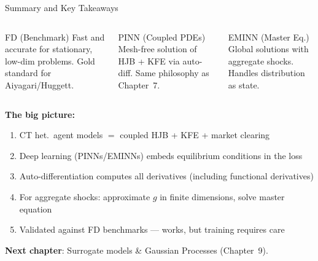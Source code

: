 \documentclass[aspectratio=169,11pt]{beamer}
\newcommand{\emphc}[1]{\textcolor{harvardcrimson}{#1}}
\begin{document}
\begin{frame}{Summary and Key Takeaways}
\begin{columns}[T]
\begin{block}{FD (Benchmark)}
\centering\small
\vspace{0.1em}
Fast and accurate for \emphc{stationary, low-dim} problems. Gold standard for Aiyagari/Huggett.
\vspace{0.1em}
\end{block}

\begin{block}{PINN (Coupled PDEs)}
\centering\small
\vspace{0.1em}
\emphc{Mesh-free} solution of HJB + KFE via auto-diff. Same philosophy as Chapter~7.
\vspace{0.1em}
\end{block}

\begin{block}{EMINN (Master Eq.)}
\centering\small
\vspace{0.1em}
\emphc{Global solutions} with aggregate shocks. Handles distribution as state.
\vspace{0.1em}
\end{block}
\end{columns}

\vspace{0.2em}
\small
\textbf{The big picture:}
\begin{enumerate}\itemsep0pt
    \item CT het.\ agent models $=$ coupled HJB + KFE + market clearing
    \item Deep learning (PINNs/EMINNs) embeds equilibrium conditions in the loss
    \item Auto-differentiation computes all derivatives (including functional derivatives)
    \item For aggregate shocks: approximate $g$ in finite dimensions, solve master equation
    \item Validated against FD benchmarks --- works, but training requires care
\end{enumerate}

\vspace{0.1em}
\begin{center}
\textbf{Next chapter}: Surrogate models \& Gaussian Processes (Chapter~9).
\end{center}
\end{frame}
\end{document}
